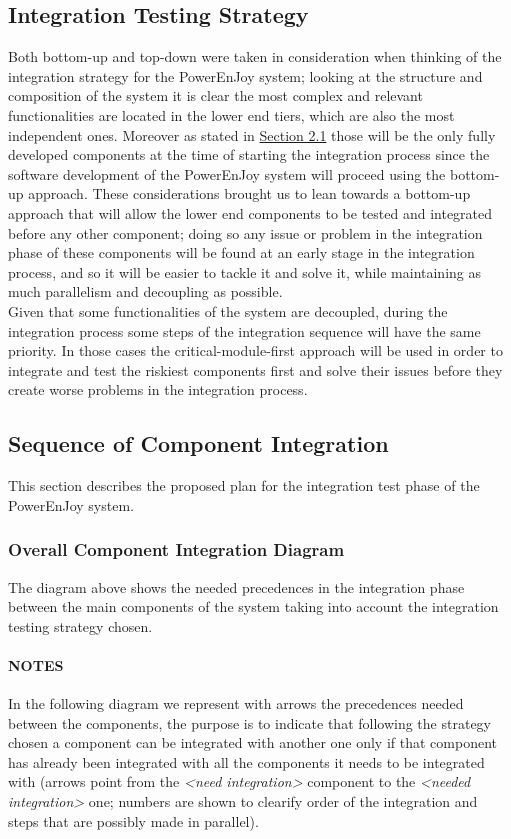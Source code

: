 \subsection{Integration Testing Strategy} \label{sec:intStrategy}
Both bottom-up and top-down were taken in consideration when thinking of the integration strategy for the PowerEnJoy system; looking at the structure and composition of the system it is clear the most complex and relevant functionalities are located in the lower end tiers, which are also the most independent ones. Moreover as stated in \hyperref[sec:entryCriteria]{Section 2.1} those will be the only fully developed components at the time of starting the integration process since the software development of the PowerEnJoy system will proceed using the bottom-up approach. These considerations brought us to lean towards a bottom-up approach that will allow the lower end components to be tested and integrated before any other component; doing so any issue or problem in the integration phase of these components will be found at an early stage in the integration process, and so it will be easier to tackle it and solve it, while maintaining as much parallelism and decoupling as possible.\\
Given that some functionalities of the system are decoupled, during the integration process some steps of the integration sequence will have the same priority. In those cases the critical-module-first approach will be used in order to integrate and test the riskiest  components first and solve their issues before they create worse problems in the integration process.

\subsection{Sequence of Component Integration}
This section describes the proposed plan for the integration test phase of the PowerEnJoy system.

\subsubsection{Overall Component Integration Diagram}  \label{sec:overallPrecedences}
The diagram above shows the needed precedences in the integration phase between the main components of the system taking into account the integration testing strategy chosen.

\paragraph{NOTES} In the following diagram we represent with arrows the precedences needed between the components, the purpose is to indicate that following the strategy chosen a component can be integrated with another one only if that component has already been integrated with all the components it needs to be integrated with (arrows point from the \emph{<need integration>} component to the \emph{<needed integration>} one; numbers are shown to clearify order of the integration and steps that are possibly made in parallel).\\


